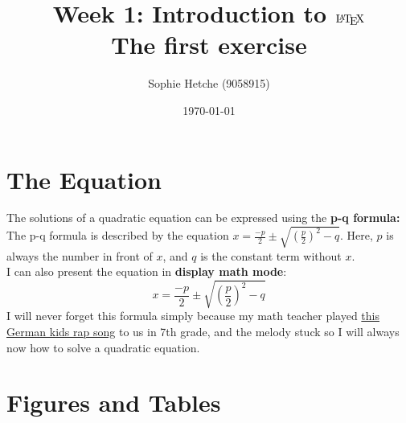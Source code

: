 \documentclass[10pt,fullpage, a4paper, titlepage]{article}
\title{\textbf{Week 1:} Introduction to $\text{\LaTeX}$\\ \small The first exercise}
\author{Sophie Hetche (9058915)}
\date{\today}
\begin{document}
\maketitle
\tableofcontents %
\newpage

\section{The Equation}

The solutions of a quadratic equation can be expressed using the \textbf{p-q formula:} \\

The p-q formula is described by the equation  $x = \frac{-p}{2} \pm \sqrt{\left(\frac{p}{2}\right)^2 - q}$. Here, $p$ is always the number in front of $x$, and $q$ is the constant term without $x$.\\

I can also present the equation in \textbf{display math mode}:
\[
x = \frac{-p}{2} \pm \sqrt{\left(\frac{p}{2}\right)^2 - q}
\]
I will never forget this formula simply because my math teacher played \href{https://www.youtube.com/watch?v=cmUHBZWZfrs}{this German kids rap song}  to us in 7th grade, and the melody stuck so I will always now how to solve a quadratic equation.


\section{Figures and Tables}
\end{document}
